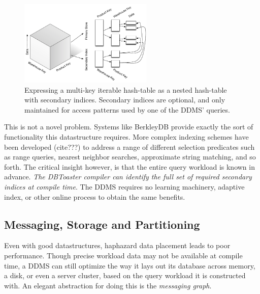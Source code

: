 \begin{figure}
\begin{center}
\includegraphics[width=2.5in]{graphics/MultikeyMap}
\end{center}
\caption{Expressing a multi-key iterable hash-table as a nested hash-table with secondary indices.  Secondary indices are optional, and only maintained for access patterns used by one of the DDMS' queries.}
\label{fig:diag:nestedHash}
\end{figure}

This is not a novel problem.  Systems like BerkleyDB\cite{bdb} provide exactly the sort of functionality this datastructure requires.  More complex indexing schemes have been developed (cite???) to address a range of different selection predicates such as range queries, nearest neighbor searches, approximate string matching, and so forth.  The critical insight however, is that the entire query workload is known in advance.  \textit{The DBToaster compiler can identify the full set of required secondary indices at compile time}.  The DDMS requires no learning machinery, adaptive index, or other online process to obtain the same benefits.


\subsection{Messaging, Storage and Partitioning}
Even with good datastructures, haphazard data placement leads to poor performance.  Though precise workload data may not be available at compile time, a DDMS can still optimize the way it lays out its database across memory, a disk, or even a server cluster, based on the query workload it is constructed with.  An elegant abstraction for doing this is the \textit{messaging graph}.

